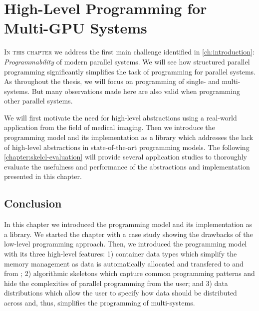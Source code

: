 
\chapter{High-Level Programming for Multi-GPU Systems}
%
%

\label{chapter:skelcl}

\lettrine[lines=3, loversize=0.1]{I}{n this chapter} we address the first main challenge identified in \autoref{ch:introduction}: \emph{Programmability} of modern parallel systems.
We will see how structured parallel programming significantly simplifies the task of programming for parallel systems.
As throughout the thesis, we will focus on programming of single- and multi-\GPU systems.
But many observations made here are also valid when programming other parallel systems.

We will first motivate the need for high-level abstractions using a real-world \OpenCL application from the field of medical imaging.
Then we introduce the \emph{\SkelCL} programming model and its implementation as a \Cpp library which addresses the lack of high-level abstractions in state-of-the-art \GPU programming models.
The following \autoref{chapter:skelcl-evaluation} will provide several application studies to thoroughly evaluate the usefulness and performance of the abstractions and implementation presented in this chapter.









\section{Conclusion}
In this chapter we introduced the \SkelCL programming model and its implementation as a \Cpp library.
We started the chapter with a case study showing the drawbacks of the low-level \OpenCL programming approach.
Then, we introduced the \SkelCL programming model with its three high-level features:
1) container data types which simplify the memory management as data is automatically allocated and transfered to and from \GPUs;
2) algorithmic skeletons which capture common programming patterns and hide the complexities of parallel programming from the user; and
3) data distributions which allow the user to specify how data should be distributed across \GPUs and, thus, simplifies the programming of multi-\GPU systems.

